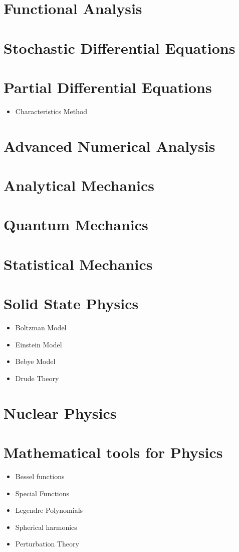 \documentclass[10pt]{article}
\begin{document}
\section{Functional Analysis}
\section{Stochastic Differential Equations}
\section{Partial Differential Equations}
\begin{itemize}
	\item Characteristics Method
\end{itemize}
\section{Advanced Numerical Analysis}
\section{Analytical Mechanics}
\section{Quantum Mechanics}
\section{Statistical Mechanics}
\section{Solid State Physics}
\begin{itemize}
	\item Boltzman Model
	\item Einstein Model
	\item Bebye Model
	\item Drude Theory
\end{itemize}
\section{Nuclear Physics}
\section{Mathematical tools for Physics}
\begin{itemize}
	\item Bessel functions
	\item Special Functions
	\item Legendre Polynomials
	\item Spherical harmonics
	\item Perturbation Theory
\end{itemize}
\end{document}
